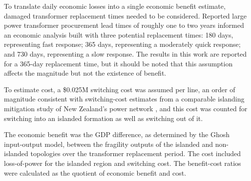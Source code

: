 \documentclass[draft]{agujournal2019}
\begin{document}
To translate daily economic losses into a single economic benefit estimate, damaged transformer replacement times needed to be considered. Reported large power transformer procurement lead times of roughly one to two years \cite{doe2014lpt} informed an economic analysis built with three potential replacement times: 180 days, representing fast response; 365 days, representing a moderately quick response; and 730 days, representing a slow response. The results in this work are reported for a 365-day replacement time, but it should be noted that this assumption affects the magnitude but not the existence of benefit.

To estimate cost, a \$0.025M switching cost was assumed per line, an order of magnitude consistent with switching-cost estimates from a comparable islanding mitigation study of New Zealand's power network \cite{oughton2026assessingeconomicbenefitsspace}, and this cost was counted for switching into an islanded formation as well as switching out of it.

The economic benefit was the GDP difference, as determined by the Ghosh input-output model, between the fragility outputs of the islanded and non-islanded topologies over the transformer replacement period. The cost included loss-of-power for the islanded region and switching cost. The benefit-cost ratios were calculated as the quotient of economic benefit and cost.
\end{document}
